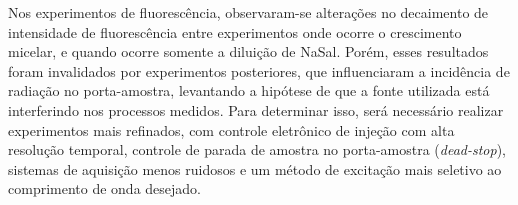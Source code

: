 	Nos experimentos de fluorescência, observaram-se alterações no decaimento de intensidade de fluorescência entre experimentos onde ocorre o crescimento micelar, e quando ocorre somente a diluição de NaSal. Porém, esses resultados foram invalidados por experimentos posteriores, que influenciaram a incidência de radiação no porta-amostra, levantando a hipótese de que a fonte utilizada está interferindo nos processos medidos. Para determinar isso, será necessário realizar experimentos mais refinados, com controle eletrônico de injeção com alta resolução temporal, controle de parada de amostra no porta-amostra (\emph{dead-stop}), sistemas de aquisição menos ruidosos e um método de excitação mais seletivo ao comprimento de onda desejado.
	
\FloatBarrier